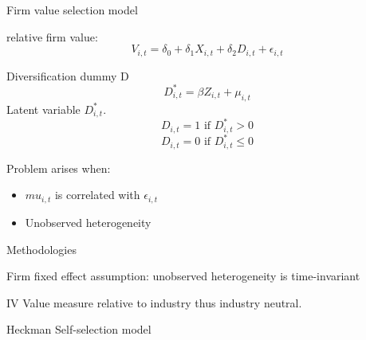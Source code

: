 \documentclass[aspectratio=169,xcolor=dvipsnames]{beamer}
\begin{document}
\begin{frame}{Firm value selection model}
    \begin{block}{relative firm value:}
        \begin{equation}
            V_{i,t} = \delta_0 + \delta_1 X_{i ,t} + \delta_2 D_{i,t} + \epsilon_{i,t}
        \end{equation}
    \end{block}
    \begin{block}{Diversification dummy D}
        \begin{equation}
            D^*_{i,t}  = \beta Z_{i, t} + \mu_{i,t}
        \end{equation}
        Latent variable $D^*_{i,t}$.
        \begin{equation}
            D_{i,t} = 1 \text{ if } D^*_{i,t} > 0
        \end{equation}
        \begin{equation}
            D_{i,t} = 0 \text{ if } D^*_{i,t} \leq 0
        \end{equation}
    \end{block}
    \begin{block}{Problem arises when:}
        \begin{itemize}
            \item $mu_{i,t}$ is correlated with $\epsilon_{i,t}$
            \item Unobserved heterogeneity
        \end{itemize}
    \end{block}
\end{frame}

\begin{frame}{Methodologies}
    \begin{block}{Firm fixed effect}
        assumption: unobserved heterogeneity is time-invariant

    \end{block}

    \begin{block}{IV}
        Value measure relative to industry thus industry neutral.

    \end{block}
    \begin{block}{Heckman Self-selection model}


    \end{block}
\end{frame}
\end{document}
